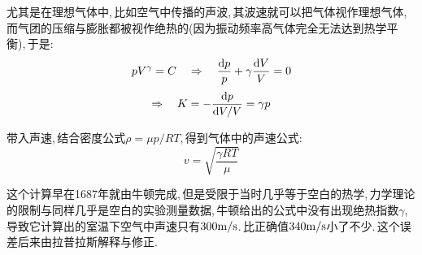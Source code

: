 尤其是在理想气体中,\,比如空气中传播的声波,\,其波速就可以把气体视作理想气体,\,而气团的压缩与膨胀都被视作绝热的(因为振动频率高气体完全无法达到热学平衡),\,于是:
\[pV^\gamma=C\quad\Rightarrow \quad \frac{\textrm{d} p}{p}+\gamma\frac{\textrm{d} V}{V}=0\]
\[\Rightarrow \quad K=-\frac{\textrm{d} p}{\textrm{d} V/V}=\gamma p\]

带入声速,\,结合密度公式$\rho=\mu p/RT$,\,得到气体中的声速公式:
\[v=\sqrt{\frac{\gamma RT}{\mu}}\]

这个计算早在1687年就由牛顿完成,\,但是受限于当时几乎等于空白的热学,\,力学理论的限制与同样几乎是空白的实验测量数据,\,牛顿给出的公式中没有出现绝热指数$\gamma$,\,导致它计算出的室温下空气中声速只有$300{\rm m/s}$.\,比正确值$340{\rm m/s}$小了不少.\,这个误差后来由拉普拉斯解释与修正.

